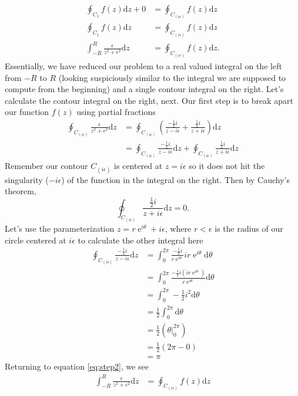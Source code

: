 \documentclass[10pt]{amsart}
\newcommand{\D}{\mathrm{d}}
\DeclareMathOperator{\E}{e}
\theoremstyle{nonumberplain}
\begin{document}
\begin{enumerate}[label={\bf {\arabic*}:}]
\begin{align}
\oint_{C_1} f(z) \D z + 0 &= \oint_{C_{(i\epsilon)}} f(z) \D z \nonumber \\
\oint_{C_1} f(z) \D z &= \oint_{C_{(i\epsilon)}} f(z) \D z \nonumber \\
\int_{-R}^R \frac{\epsilon}{z^2 + \epsilon^2} \D z &= \oint_{C_{(i\epsilon)}} f(z) \D z.
\label{eq:step2}
\end{align}
Essentially, we have reduced our problem to a real valued integral on the left from $-R$ to $R$ (looking suspiciously similar to the integral we are supposed to compute from the beginning) and a single contour integral on the right.
Let's calculate the contour integral on the right, next.
Our first step is to break apart our function $f(z)$ using partial fractions
\begin{align*}
\oint_{C_{(i\epsilon)}} \frac{\epsilon}{z^2 + \epsilon^2} \D z &= \oint_{C_{(i\epsilon)}} \left(
		\frac{-\frac 1 2 i}{z - i\epsilon} + \frac{\frac 1 2 i}{z + i\epsilon}
	\right) \D z \\
	&= \oint_{C_{(i\epsilon)}} \frac{-\frac 1 2 i}{z - i\epsilon} \D z
	+ \oint_{C_{(i\epsilon)}} \frac{\frac 1 2 i}{z + i\epsilon} \D z
\end{align*}
Remember our contour $C_{(i\epsilon)}$ is centered at $z =i\epsilon$ so it does not hit the singularity ($-i\epsilon$) of the function in the integral on the right.
Then by Cauchy's theorem,
$$\oint_{C_{(i\epsilon)}} \frac{\frac 1 2 i}{z + i\epsilon} \D z = 0.$$
Let's use the parameterization $z = r\E^{i\theta} + i\epsilon$, where $r<\epsilon$ is the radius of our circle centered at $i\epsilon$ to calculate the other integral here
\begin{align*}
\oint_{C_{(i\epsilon)}} \frac{-\frac 1 2 i}{z - i\epsilon} \D z
	&= \int_0^{2\pi} \frac{-\frac 1 2 i}{r\E^{i\theta}} ir\E^{i\theta}\D \theta \\
	&= \int_0^{2\pi} \frac{-\frac 1 2 i\left(ir\E^{i\theta}\right)}{r\E^{i\theta}} \D \theta \\
	&= \int_0^{2\pi} -\frac1 2 i^2 \D \theta \\
	&= \frac1 2 \int_0^{2\pi} \D \theta \\
	&= \frac1 2 \left( \left. \theta \right|_0^{2\pi}\right) \\
	&= \frac1 2 \left( 2\pi - 0 \right) \\
	&= \pi
\end{align*}
Returning to equation \eqref{eq:step2}, we see
\begin{align}
\int_{-R}^R \frac{\epsilon}{z^2 + \epsilon^2} \D z &= \oint_{C_{(i\epsilon)}} f(z) \D z \nonumber \\

\end{align}
\end{enumerate}
\end{document}
